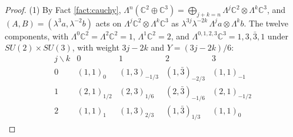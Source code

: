 \documentclass[11pt]{article}
\theoremstyle{definition}
\newcommand{\C}{\mathbb{C}}
\begin{document}
\begin{proof}
(1) By Fact \ref{fact:cauchy}, $\Lambda^{n}(\C^{2} \oplus \C^{3}) = \bigoplus_{j+k=n}\Lambda^{j}\C^{2} \otimes \Lambda^{k}\C^{3}$, and $(A, B) = (\lambda^{3}a, \lambda^{-2}b)$ acts on $\Lambda^{j}\C^{2} \otimes \Lambda^{k}\C^{3}$ as $\lambda^{3j}\lambda^{-2k}\,\Lambda^{j}a \otimes \Lambda^{k}b$. The twelve components, with $\Lambda^{0}\C^{2} = \Lambda^{2}\C^{2} = 1$, $\Lambda^{1}\C^{2} = 2$, and $\Lambda^{0,1,2,3}\C^{3} = 1, 3, \bar{3}, 1$ under $SU(2) \times SU(3)$, with weight $3j - 2k$ and $Y = (3j-2k)/6$:
\[
\begin{array}{c|cccc}
j \backslash k & 0 & 1 & 2 & 3 \\ \hline
0 & (1,1)_{0} & (1,3)_{-1/3} & (1,\bar{3})_{-2/3} & (1,1)_{-1} \\
1 & (2,1)_{1/2} & (2,3)_{1/6} & (2,\bar{3})_{-1/6} & (2,1)_{-1/2} \\
2 & (1,1)_{1} & (1,3)_{2/3} & (1,\bar{3})_{1/3} & (1,1)_{0}
\end{array}
\]

\end{proof}
\end{document}
